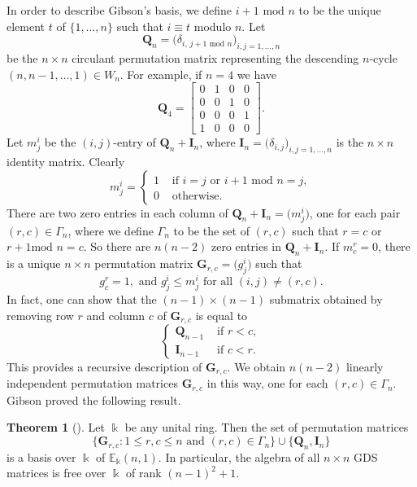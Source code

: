 \documentclass[10pt]{article}
\theoremstyle{definition}
\newtheorem{theo}[theorem]{Theorem}
\newcommand{\E}{\mathbb{E}}
\newcommand{\bQ}{\mathbf{Q}}
\newcommand{\bI}{\mathbf{I}}
\newcommand{\bG}{\mathbf{G}}
\begin{document}
In order to describe Gibson's basis, we define $i+1 \text{ mod } n$ to
be the unique element $t$ of $\{1, \dots, n\}$ such that $i \equiv t$
modulo $n$. Let
\[
\bQ_n = \big( \delta_{i,\, j+1 \text{ mod } n} \big)_{i,j = 1, \dots, n}
\]
be the $n \times n$ circulant permutation matrix representing the
descending $n$-cycle $(n, n-1, \dots, 1) \in W_n$. For example, if
$n=4$ we have
\[
\bQ_4 = 
\begin{bmatrix}
 0&1&0&0\\
 0&0&1&0\\
 0&0&0&1\\
 1&0&0&0
\end{bmatrix}.
\]
Let $m^i_j$ be the $(i,j)$-entry of $\bQ_n + \bI_n$, where $\bI_n =
\big( \delta_{i,j} \big)_{i,j = 1, \dots, n}$ is the $n \times n$
identity matrix. Clearly
\[ m^i_{j} = 
\begin{cases}
 1 & \text{ if } i=j \text{ or } i+1 \text{ mod } n = j,\\
 0 & \text{ otherwise.}
\end{cases}
\]
There are two zero entries in each column of $\bQ_n + \bI_n = \big(
m^i_{j} \big)$, one for each pair $(r,c) \in \Gamma_n$, where we define
$\Gamma_n$ to be the set of $(r,c)$ such that $r = c$ or $r+1 \text{
 mod } n = c$. So there are $n(n-2)$ zero entries in $\bQ_n +
\bI_n$. If $m^r_c = 0$, there is a unique $n \times n$ permutation
matrix $\bG_{r,c} = \big(g^i_j\big)$ such that
\[
g^r_c = 1, \text{ and } g^i_j \le m^i_j \text{ for all } (i,j) \ne (r,c).
\]
In fact, one can show that the $(n-1) \times (n-1)$ submatrix obtained
by removing row $r$ and column $c$ of $\bG_{r,c}$ is equal to
\[
 \begin{cases}
 \bQ_{n-1} & \text{ if } r<c,\\
 \bI_{n-1} & \text{ if } c<r.
 \end{cases}
\]
This provides a recursive description of $\bG_{r,c}$. We obtain
$n(n-2)$ linearly independent permutation matrices $\bG_{r,c}$ in this
way, one for each $(r,c) \in \Gamma_n$. Gibson proved the following
result.


\begin{theo}[{\cite[Thm.~2.1]{Gibson}}]
Let $\Bbbk$ be any unital ring. Then the set of permutation matrices 
\[
 \{ \bG_{r,c}: 1 \le r,c \le n \text{ and } (r,c) \in \Gamma_n \}
 \cup \{ \bQ_n, \bI_n \}
\]
is a basis over $\Bbbk$ of $\E_\Bbbk(n,1)$. In particular, the algebra
of all $n \times n$ GDS matrices is free over $\Bbbk$ of rank $(n-1)^2
+ 1$.
\end{theo}
\end{document}
